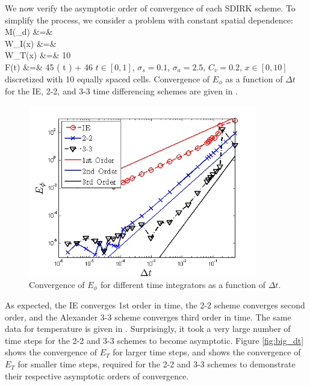 We now verify the asymptotic order of convergence of each SDIRK scheme.
To simplify the process, we consider a problem with constant spatial dependence:
\beanum
M(\mu_d) &=&  \\
W_I(x) &=&  \\
W_T(x) &=&  10 \\
F(t) &=& 45 \cos\left( \pi t \right) + 46 \pec
\eeanum
$t \in[0,1]$, $\sigma_s = 0.1$, $\sigma_a = 2.5$, $C_v = 0.2$, $x\in[0,10]$ discretized with 10 equally spaced cells.  Convergence of $E_{\phi}$ as a function of $\Delta t$ for the IE, 2-2, and 3-3 time differencing schemes are given in .
\begin{figure}[!htp]
\centering
\includegraphics[width=10cm]{chapter6_grey_radtran/Extended_Time_Integrators_Convergence_Phi.png}
\caption{Convergence of $E_{\phi}$ for different time integrators as a function of $\Delta t$.}
\label{fig:e_phi_time}
\end{figure}
As expected, the IE converges 1st order in time, the 2-2 scheme converges second order, and the Alexander 3-3 scheme converges third order in time.
The same data for temperature is given in .  Surprisingly, it took a very large number of time steps for the 2-2 and 3-3 schemes to become asymptotic.
Figure \ref{fig:big_dt} shows the convergence of $E_{T}$ for larger time steps, and  shows the convergence of $E_{T}$ for smaller time steps, required for the 2-2 and 3-3 schemes to demonstrate their respective asymptotic orders of convergence.
